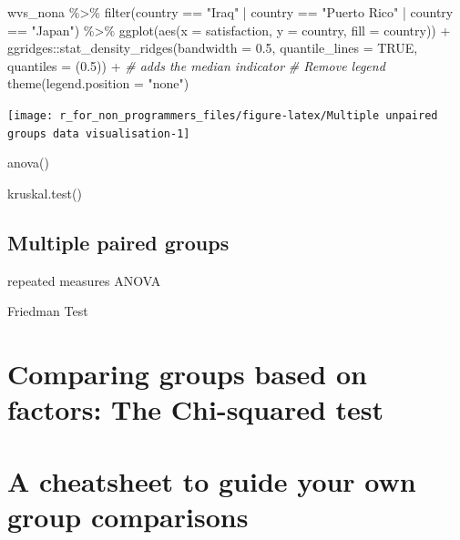 \documentclass[
]{book}
\newenvironment{Shaded}{\begin{snugshade}}{\end{snugshade}}
\newcommand{\AttributeTok}[1]{\textcolor[rgb]{0.77,0.63,0.00}{#1}}
\newcommand{\CommentTok}[1]{\textcolor[rgb]{0.56,0.35,0.01}{\textit{#1}}}
\newcommand{\ConstantTok}[1]{\textcolor[rgb]{0.00,0.00,0.00}{#1}}
\newcommand{\FloatTok}[1]{\textcolor[rgb]{0.00,0.00,0.81}{#1}}
\newcommand{\FunctionTok}[1]{\textcolor[rgb]{0.00,0.00,0.00}{#1}}
\newcommand{\NormalTok}[1]{#1}
\newcommand{\SpecialCharTok}[1]{\textcolor[rgb]{0.00,0.00,0.00}{#1}}
\newcommand{\StringTok}[1]{\textcolor[rgb]{0.31,0.60,0.02}{#1}}
\begin{document}
\begin{Shaded}
\begin{Highlighting}[]
\NormalTok{wvs\_nona }\SpecialCharTok{\%\textgreater{}\%} 
  \FunctionTok{filter}\NormalTok{(country }\SpecialCharTok{==} \StringTok{"Iraq"} \SpecialCharTok{|}\NormalTok{ country }\SpecialCharTok{==} \StringTok{"Puerto Rico"} \SpecialCharTok{|}\NormalTok{ country }\SpecialCharTok{==} \StringTok{"Japan"}\NormalTok{) }\SpecialCharTok{\%\textgreater{}\%}
  \FunctionTok{ggplot}\NormalTok{(}\FunctionTok{aes}\NormalTok{(}\AttributeTok{x =}\NormalTok{ satisfaction, }\AttributeTok{y =}\NormalTok{ country, }\AttributeTok{fill =}\NormalTok{ country)) }\SpecialCharTok{+}
\NormalTok{  ggridges}\SpecialCharTok{::}\FunctionTok{stat\_density\_ridges}\NormalTok{(}\AttributeTok{bandwidth =} \FloatTok{0.5}\NormalTok{,}
                                \AttributeTok{quantile\_lines =} \ConstantTok{TRUE}\NormalTok{,}
                                \AttributeTok{quantiles =}\NormalTok{ (}\FloatTok{0.5}\NormalTok{)) }\SpecialCharTok{+}      \CommentTok{\# adds the median indicator}
  \CommentTok{\# Remove legend}
  \FunctionTok{theme}\NormalTok{(}\AttributeTok{legend.position =} \StringTok{"none"}\NormalTok{)}
\end{Highlighting}
\end{Shaded}

\begin{center}\texttt{[image: r\_for\_non\_programmers\_files/figure-latex/Multiple unpaired groups data visualisation-1]} \end{center}

anova()

kruskal.test()

\hypertarget{multiple-paired-groups}{%
\subsection{Multiple paired groups}\label{multiple-paired-groups}}

repeated measures ANOVA

Friedman Test

\hypertarget{chi-squared-test}{%
\section{Comparing groups based on factors: The Chi-squared test}\label{chi-squared-test}}

\hypertarget{cheatsheet-group-comparisons}{%
\section{A cheatsheet to guide your own group comparisons}\label{cheatsheet-group-comparisons}}
\end{document}
